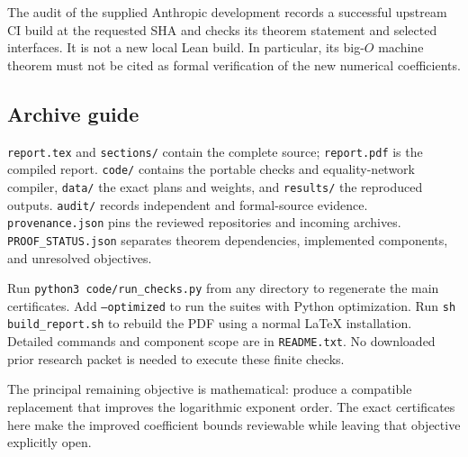 The audit of the supplied Anthropic development records a successful
upstream CI build at the requested SHA and checks its theorem statement
and selected interfaces. It is not a new local Lean build. In particular,
its big-$O$ machine theorem must not be cited as formal verification of
the new numerical coefficients.

\subsection{Archive guide}

\texttt{report.tex} and \texttt{sections/} contain the complete source;
\texttt{report.pdf} is the compiled report. \texttt{code/} contains the
portable checks and equality-network compiler, \texttt{data/} the exact
plans and weights, and \texttt{results/} the reproduced outputs.
\texttt{audit/} records independent and formal-source evidence.
\texttt{provenance.json} pins the reviewed repositories and incoming
archives. \texttt{PROOF\_STATUS.json} separates theorem dependencies,
implemented components, and unresolved objectives.

Run \texttt{python3 code/run\_checks.py} from any directory to regenerate
the main certificates. Add \texttt{--optimized} to run the suites with
Python optimization. Run \texttt{sh build\_report.sh} to rebuild the PDF
using a normal LaTeX installation. Detailed commands and component scope
are in \texttt{README.txt}. No downloaded prior research packet is needed
to execute these finite checks.

The principal remaining objective is mathematical: produce a compatible
replacement that improves the logarithmic exponent order. The exact
certificates here make the improved coefficient bounds reviewable while
leaving that objective explicitly open.
